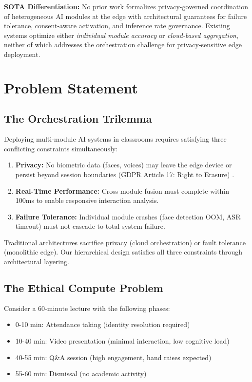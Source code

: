 \documentclass[conference]{IEEEtran}
\begin{document}
\textbf{SOTA Differentiation:} No prior work formalizes privacy-governed coordination of heterogeneous AI modules at the edge with architectural guarantees for failure tolerance, consent-aware activation, and inference rate governance. Existing systems optimize either \textit{individual module accuracy} or \textit{cloud-based aggregation}, neither of which addresses the orchestration challenge for privacy-sensitive edge deployment.

\section{Problem Statement}

\subsection{The Orchestration Trilemma}
Deploying multi-module AI systems in classrooms requires satisfying three conflicting constraints simultaneously:

\begin{enumerate}
    \item \textbf{Privacy:} No biometric data (faces, voices) may leave the edge device or persist beyond session boundaries (GDPR Article 17: Right to Erasure) \cite{b4}.
    \item \textbf{Real-Time Performance:} Cross-module fusion must complete within 100ms to enable responsive interaction analysis.
    \item \textbf{Failure Tolerance:} Individual module crashes (face detection OOM, ASR timeout) must not cascade to total system failure.
\end{enumerate}

Traditional architectures sacrifice privacy (cloud orchestration) or fault tolerance (monolithic edge). Our hierarchical design satisfies all three constraints through architectural layering.

\subsection{The Ethical Compute Problem}
Consider a 60-minute lecture with the following phases:
\begin{itemize}
    \item 0-10 min: Attendance taking (identity resolution required)
    \item 10-40 min: Video presentation (minimal interaction, low cognitive load)
    \item 40-55 min: Q\&A session (high engagement, hand raises expected)
    \item 55-60 min: Dismissal (no academic activity)
\end{itemize}
\end{document}
